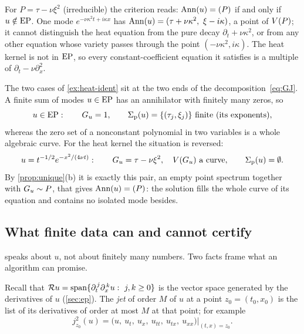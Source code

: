 \begin{example}\label{ex:heat-ident}
For $P=\tau-\nu\xi^2$ (irreducible) the criterion reads: $\operatorname{Ann}(u)=(P)$ if and only if $u\notin\mathrm{EP}$.
One mode $e^{-\nu\kappa^2t+i\kappa x}$ has $\Ann(u)=(\tau+\nu\kappa^2,\ \xi-i\kappa)$, a point of
$V(P)$; it cannot distinguish the heat equation from the pure decay $\partial_t+\nu\kappa^2$, or from
any other equation whose variety passes through the point $(-\nu\kappa^2,i\kappa)$. The heat kernel is not in $\mathrm{EP}$, so every
constant-coefficient equation it satisfies is a multiple of $\partial_t-\nu\partial_x^2$.
\end{example}

\begin{remark}\label{rem:curves-points}
The two cases of \cref{ex:heat-ident} sit at the two ends of the decomposition~\eqref{eq:GJ}. A finite sum of modes
$u\in\mathrm{EP}$ has an annihilator with finitely many zeros, so
\[
  u\in\mathrm{EP}:\qquad G_u=1,\qquad \Sigma_{\mathrm p}(u)=\{(\tau_j,\xi_j)\}\ \text{finite (its exponents)},
\]
whereas the zero set of a nonconstant polynomial in two variables is a whole algebraic curve. For the heat kernel
the situation is reversed:
\[
  u=t^{-1/2}e^{-x^2/(4\nu t)}:\qquad G_u=\tau-\nu\xi^2,\quad V(G_u)\ \text{a curve},\qquad \Sigma_{\mathrm p}(u)=\emptyset .
\]
By \cref{prop:unique}(b) it is exactly this pair, an empty point spectrum together with $G_u\sim P$, that gives
$\operatorname{Ann}(u)=(P)$: the solution fills the whole curve of its equation and contains no isolated mode besides.
\end{remark}


\subsection{What finite data can and cannot certify}\label{sec:certify}
 speaks about $u$, not about finitely many numbers. Two facts frame what an algorithm
can promise.

Recall that $\mathcal{R} u=\operatorname{span}\{\partial_t^{\,j}\partial_x^{\,k}u:\ j,k\ge0\}$ is the vector space generated by the
derivatives of $u$ (\cref{sec:ep}). The \emph{jet} of order $M$ of $u$ at a point $z_0=(t_0,x_0)$ is the list of its
derivatives of order at most $M$ at that point; for example
\[
  j^2_{z_0}(u)=\big(u,\ u_t,\ u_x,\ u_{tt},\ u_{tx},\ u_{xx}\big)\big|_{(t,x)=z_0}.
\]

